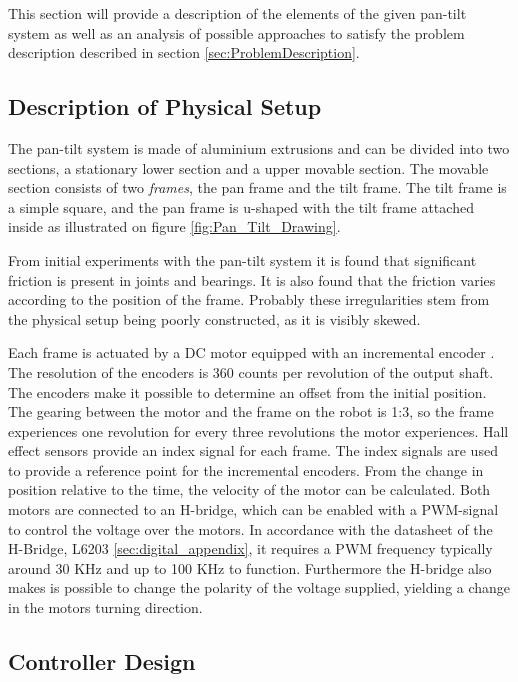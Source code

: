 \documentclass[../../main.tex]{subfiles}
\begin{document}
This section will provide a description of the elements of the given pan-tilt system as well as an analysis of possible approaches to satisfy the problem description described in section \ref{sec:ProblemDescription}.

\subsection{Description of Physical Setup}
The pan-tilt system is made of aluminium extrusions and can be divided into two sections, a stationary lower section and a upper movable section. The movable section consists of two \textit{frames}, the pan frame and the tilt frame. The tilt frame is a simple square, and the pan frame is u-shaped with the tilt frame attached inside as illustrated on figure \ref{fig:Pan_Tilt_Drawing}.

From initial experiments with the pan-tilt system it is found that significant friction is present in joints and bearings. It is also found that the friction varies according to the position of the frame. Probably these irregularities stem from the physical setup being poorly constructed, as it is visibly skewed.  

Each frame is actuated by a DC motor equipped with an incremental encoder \cite{}. The resolution of the encoders is 360 counts per revolution of the output shaft. The encoders make it possible to determine an offset from the initial position. The gearing between the motor and the frame on the robot is 1:3, so the frame experiences one revolution for every three revolutions the motor experiences. Hall effect sensors \cite{} provide an index signal for each frame. The index signals are used to provide a reference point for the incremental encoders. From the change in position relative to the time, the velocity of the motor can be calculated. Both motors are connected to an H-bridge, which can be enabled with a PWM-signal to control the voltage over the motors. In accordance with the datasheet of the H-Bridge, L6203 \ref{sec:digital_appendix}, it requires a PWM frequency typically around 30 KHz and up to 100 KHz to function. Furthermore the H-bridge also makes is possible to change the polarity of the voltage supplied, yielding a change in the motors turning direction.

\subsection{Controller Design}
\end{document}
